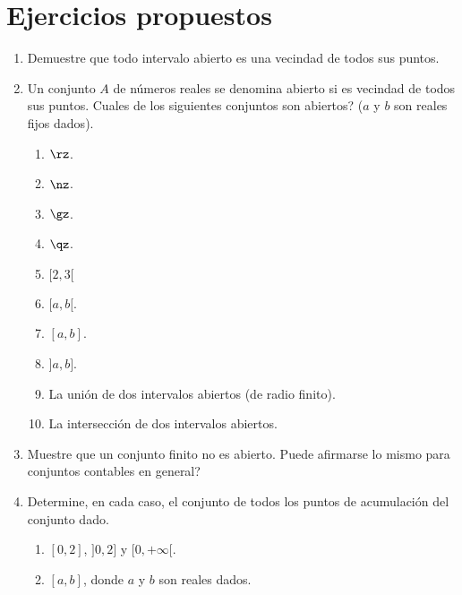 \newpage

\section{Ejercicios propuestos}

\begin{enumerate}
\item Demuestre que todo intervalo abierto es una vecindad de todos sus puntos.

\item Un conjunto $A$ de n\'{u}meros reales se denomina
%
abierto si es vecindad de todos sus puntos. \textquestiondown Cuales de los
siguientes conjuntos son abiertos? ($a$ y $b$ son reales fijos dados).

\begin{enumerate}
\item $\rz$.

\item $\nz$.

\item $\gz$.

\item $\qz$.

\item $[2,3[$

\item $[a,b[$.

\item $[a,b]$.

\item $]a,b]$.

\item La uni\'{o}n de dos intervalos abiertos (de radio finito).

\item La intersecci\'{o}n de dos intervalos abiertos.
\end{enumerate}

\item Muestre que un conjunto finito no es abierto. \textquestiondown Puede
afirmarse lo mismo para conjuntos contables en general?

\item Determine, en cada caso, el conjunto de todos los puntos de
acumulaci\'{o}n del conjunto dado.

\begin{enumerate}
\item $[0,2]$, $]0,2]$ y $[0,+\infty\lbrack$.

\item $[a,b]$, donde $a$ y $b$ son reales dados.


\end{enumerate}
\end{enumerate}
